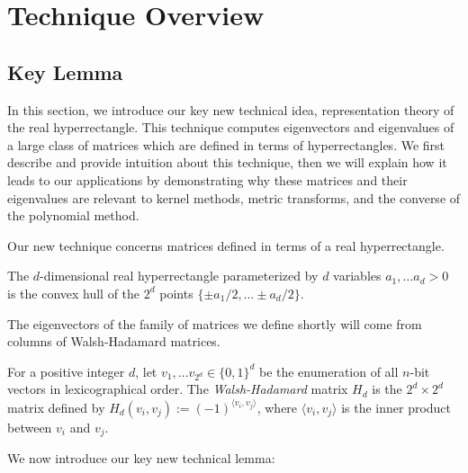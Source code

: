 
\section{Technique Overview} \label{sec:techniques}

\subsection{Key Lemma}
In this section, we introduce our key new technical idea, representation theory of the real hyperrectangle. This technique computes eigenvectors and eigenvalues of a large class of matrices which are defined in terms of hyperrectangles. We first describe and provide intuition about this technique, then we will explain how it leads to our applications by demonstrating why these matrices and their eigenvalues are relevant to kernel methods, metric transforms, and the converse of the polynomial method.

Our new technique concerns matrices defined in terms of a real hyperrectangle. 
\begin{definition} \label{def:hyperrectangle}
The $d$-dimensional real hyperrectangle parameterized by $d$ variables $a_1, \ldots a_d > 0$ is the convex hull of the $2^d$ points $\{\pm a_1/2, \ldots \pm a_d/2 \}$.
\end{definition}

The eigenvectors of the family of matrices we define shortly will come from columns of Walsh-Hadamard matrices.
\begin{definition} 
For a positive integer $d$, let $v_1, \ldots v_{2^d} \in \{0,1\}^d$ be the enumeration of all $n$-bit vectors in lexicographical order. The \emph{Walsh-Hadamard} matrix $H_d$ is the $2^d \times 2^d$ matrix defined by $H_d(v_i, v_j) := (-1)^{\langle v_i, v_j \rangle }$, where $\langle v_i, v_j \rangle$ is the inner product between $v_i$ and $v_j$.
\end{definition}

We now introduce our key new technical lemma:

